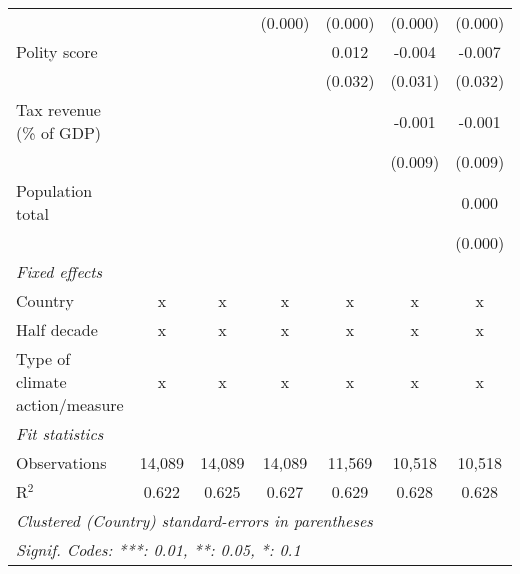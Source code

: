 \begin{tabular}{lcccccc}
                                                                                    &         &               & (0.000)       & (0.000)       & (0.000)       & (0.000)\\   
   Polity score                                                                     &         &               &               & 0.012         & -0.004        & -0.007\\   
                                                                                    &         &               &               & (0.032)       & (0.031)       & (0.032)\\   
   Tax revenue (\% of GDP)                                                          &         &               &               &               & -0.001        & -0.001\\   
                                                                                    &         &               &               &               & (0.009)       & (0.009)\\   
   Population total                                                                 &         &               &               &               &               & 0.000\\   
                                                                                    &         &               &               &               &               & (0.000)\\   
   \emph{Fixed effects}\\
   Country                                                                          & x       & x             & x             & x             & x             & x\\  
   Half decade                                                                      & x       & x             & x             & x             & x             & x\\  
   Type of climate action/measure                                                   & x       & x             & x             & x             & x             & x\\  
   \midrule \emph{Fit statistics}\\
   Observations                                                                     & 14,089  & 14,089        & 14,089        & 11,569        & 10,518        & 10,518\\  
   R$^2$                                                                            & 0.622   & 0.625         & 0.627         & 0.629         & 0.628         & 0.628\\  
   \midrule
   \multicolumn{7}{l}{\emph{Clustered (Country) standard-errors in parentheses}}\\
   \multicolumn{7}{l}{\emph{Signif. Codes: ***: 0.01, **: 0.05, *: 0.1}}\\
\end{tabular}
\par\endgroup


